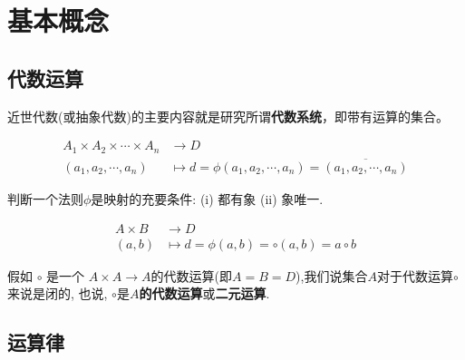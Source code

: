 \section{基本概念}

\subsection{代数运算}

\begin{Note}
近世代数(或抽象代数)的主要内容就是研究所谓\textbf{代数系统}，即带有运算的集合。
\end{Note}

\begin{Definition}[映射]
$$ \begin{aligned}
A_1 \times A_2 \times \cdots \times A_n &\rightarrow D \\
 (a_1, a_2, \cdots, a_n) &\mapsto d = \phi (a_1, a_2, \cdots, a_n) = \overline{(a_1, a_2, \cdots, a_n)} \end{aligned}$$ 
\end{Definition}

\begin{Note}
判断一个法则$\phi$是映射的充要条件: (i) 都有象 (ii) 象唯一.
\end{Note}

\begin{Definition}[代数运算] 
$$\begin{aligned}
A \times B &\rightarrow D \\ 
(a, b) &\mapsto d = \phi(a, b) = \circ (a, b) = a \circ b \end{aligned}$$
\end{Definition}


{\color{gray}{
\begin{Note}
$A = B$时, 对于代数运算$ A \times A \rightarrow D $, $ a \circ b $ 和 $ b \circ a $ 都有意义，但不一定相等.
\end{Note}
}}


\begin{Definition} 
假如 $ \circ $ 是一个 $ A \times A \rightarrow A$的代数运算(即$A = B = D$),我们说集合$A$对于代数运算$\circ$来说是闭的, 也说, $\circ$是\textbf{$A$的代数运算}或\textbf{二元运算}.
\end{Definition}

\subsection{运算律}

